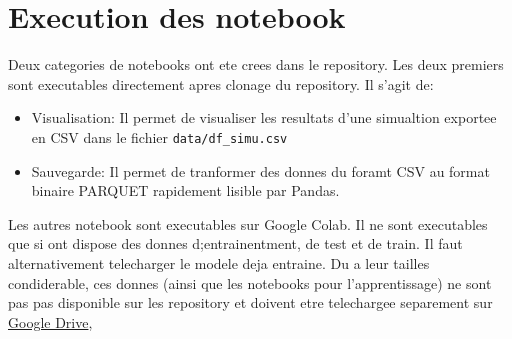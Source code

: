 \section{Execution des notebook}
Deux categories de notebooks ont ete crees dans le repository. Les deux premiers sont executables directement apres clonage du repository. Il s'agit de:
\begin{itemize}
 \item Visualisation: Il permet de visualiser les resultats d'une simualtion exportee en CSV dans le fichier \verb|data/df_simu.csv|
 \item Sauvegarde: Il permet de tranformer des donnes du foramt CSV au format binaire PARQUET rapidement lisible par Pandas.
\end{itemize}

Les autres notebook sont executables sur Google Colab. Il ne sont executables que si ont dispose des donnes d;entrainentment, de test et de train. Il faut alternativement telecharger le modele deja entraine. Du a leur tailles condiderable, ces donnes (ainsi que les notebooks pour l'apprentissage) ne sont pas pas disponible sur les repository et doivent etre telechargee separement sur \href{https://drive.google.com/drive/folders/1beYPm0n-GfyhcmAOO13HLm6GAQncAbTB?usp=sharing}{Google Drive}, 
